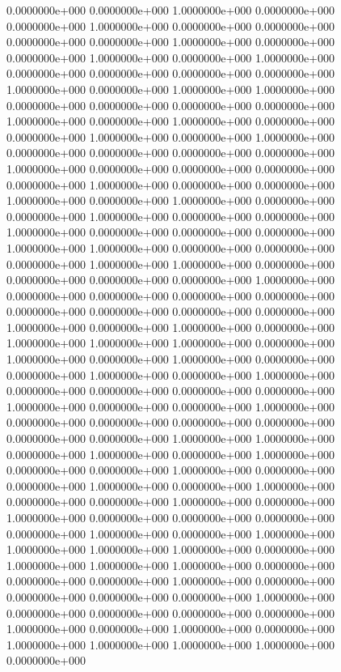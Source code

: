   0.0000000e+000  0.0000000e+000  1.0000000e+000  0.0000000e+000  0.0000000e+000
  1.0000000e+000  0.0000000e+000  0.0000000e+000  0.0000000e+000  0.0000000e+000
  1.0000000e+000  0.0000000e+000  0.0000000e+000  1.0000000e+000  0.0000000e+000
  1.0000000e+000  0.0000000e+000  0.0000000e+000  0.0000000e+000  0.0000000e+000
  1.0000000e+000  0.0000000e+000  1.0000000e+000  1.0000000e+000  0.0000000e+000
  0.0000000e+000  0.0000000e+000  0.0000000e+000  1.0000000e+000  0.0000000e+000
  1.0000000e+000  0.0000000e+000  0.0000000e+000  1.0000000e+000  0.0000000e+000
  1.0000000e+000  0.0000000e+000  0.0000000e+000  0.0000000e+000  0.0000000e+000
  1.0000000e+000  0.0000000e+000  0.0000000e+000  0.0000000e+000  0.0000000e+000
  1.0000000e+000  0.0000000e+000  0.0000000e+000  1.0000000e+000  0.0000000e+000
  1.0000000e+000  0.0000000e+000  0.0000000e+000  1.0000000e+000  0.0000000e+000
  0.0000000e+000  1.0000000e+000  0.0000000e+000  0.0000000e+000  0.0000000e+000
  1.0000000e+000  1.0000000e+000  0.0000000e+000  0.0000000e+000  0.0000000e+000
  1.0000000e+000  1.0000000e+000  0.0000000e+000  0.0000000e+000  0.0000000e+000
  0.0000000e+000  1.0000000e+000  0.0000000e+000  0.0000000e+000  0.0000000e+000
  0.0000000e+000  0.0000000e+000  0.0000000e+000  0.0000000e+000  0.0000000e+000
  1.0000000e+000  0.0000000e+000  1.0000000e+000  0.0000000e+000  1.0000000e+000
  1.0000000e+000  1.0000000e+000  0.0000000e+000  1.0000000e+000  0.0000000e+000
  1.0000000e+000  0.0000000e+000  0.0000000e+000  1.0000000e+000  0.0000000e+000
  1.0000000e+000  0.0000000e+000  0.0000000e+000  0.0000000e+000  0.0000000e+000
  1.0000000e+000  0.0000000e+000  0.0000000e+000  1.0000000e+000  0.0000000e+000
  0.0000000e+000  0.0000000e+000  0.0000000e+000  0.0000000e+000  0.0000000e+000
  1.0000000e+000  1.0000000e+000  0.0000000e+000  1.0000000e+000  0.0000000e+000
  1.0000000e+000  0.0000000e+000  0.0000000e+000  1.0000000e+000  0.0000000e+000
  0.0000000e+000  1.0000000e+000  0.0000000e+000  1.0000000e+000  0.0000000e+000
  0.0000000e+000  1.0000000e+000  0.0000000e+000  1.0000000e+000  0.0000000e+000
  0.0000000e+000  0.0000000e+000  0.0000000e+000  1.0000000e+000  0.0000000e+000
  1.0000000e+000  1.0000000e+000  1.0000000e+000  1.0000000e+000  0.0000000e+000
  1.0000000e+000  1.0000000e+000  1.0000000e+000  0.0000000e+000  0.0000000e+000
  0.0000000e+000  1.0000000e+000  0.0000000e+000  0.0000000e+000  0.0000000e+000
  0.0000000e+000  1.0000000e+000  0.0000000e+000  0.0000000e+000  0.0000000e+000
  0.0000000e+000  1.0000000e+000  0.0000000e+000  1.0000000e+000  0.0000000e+000
  1.0000000e+000  1.0000000e+000  1.0000000e+000  1.0000000e+000  0.0000000e+000
